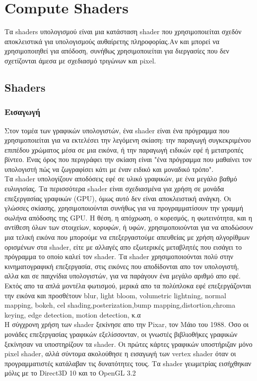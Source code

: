 \section{Compute Shaders}
Τα shaders υπολογισμού είναι μια κατάσταση shader που χρησιμοποιείται σχεδόν αποκλειστικά για υπολογισμούς αυθαίρετης πληροφορίας.Αν και μπορεί να χρησιμοποιηθεί για απόδοση, συνήθως χρησιμοποιείται για διεργασίες που δεν σχετίζονται άμεσα με σχεδιασμό τριγώνων και pixel.\cite{computeshaders-1}
\subsection{Shaders}
\subsubsection{Εισαγωγή}
Στον τομέα των γραφικών υπολογιστών, ένα shader είναι ένα πρόγραμμα που χρησιμοποιείται για να εκτελέσει την λεγόμενη σκίαση: την παραγωγή συγκεκριμένου επιπέδου χρώματος μέσα σε μια εικόνα, ή την παραγωγή ειδικών εφέ ή μετατροπές βίντεο. Ένας όρος που περιγράφει την σκίαση είναι "ένα πρόγραμμα που μαθαίνει τον υπολογιστή πώς να ζωγραφίσει κάτι με έναν ειδικό και μοναδικό τρόπο".\\
Τα shader υπολογίζουν αποδόσεις εφέ σε υλικό γραφικών, με ένα μεγάλο βαθμό ευλυγισίας. Τα περισσότερα shader είναι σχεδιασμένα για χρήση σε μονάδα επεξεργασίας γραφικών (GPU), όμως αυτό δεν είναι αποκλειστική ανάγκη. Οι γλώσσες σκίασης, χρησιμοποιούνται συνήθως για να προγραμματίσουν την γραμμή σωλήνα απόδοσης της GPU. Η θέση, η απόχρωση, ο κορεσμός, η φωτεινότητα, και η αντίθεση όλων των στοιχείων, κορυφών, ή υφών, χρησιμοποιούνται για να αποδώσουν μια τελική εικόνα που μπορούμε να επεξεργαστούμε απευθείας με χρήση αλγορίθμων ορισμένων στα shader, είτε με αλλαγές απο εξωτερικές μεταβλητές που εισάγει το πρόγραμμα το οποίο καλεί τον shader.
Τα shader χρησιμοποιούνται πολύ στην κινηματογραφική επεξεργασία, στις εικόνες που αποδίδονται απο τον υπολογιστή, αλλα και σε παιχνίδια υπολογιστών, για να παράγουν ένα μεγάλο αριθμό απο εφέ. Εκτός απο τα απλά μοντέλα φωτισμού, μερικά απο τα πολύπλοκα εφέ επεξεργάζονται την εικόνα και προσθέτουν blur, light bloom, volumetric lightning, normal mapping, bokeh, cel shading,posterization,bump mapping,distortion,chroma keying, edge detection, motion detection, κ.α\\
Η σύγχρονη χρήση των shader ξεκίνησε απο την Pixar, τον Μάιο του 1988. Όσο οι μονάδες επεξεργασίας γραφικών εξελίσσονταν, οι γνωστές βιβλιοθήκες γραφικών ξεκίνησαν να υποστηρίζουν τα shader. Οι πρώτες κάρτες γραφικών υποστήριζαν μόνο pixel shader, αλλά σύντομα ακολούθησε η εισαγωγή των vertex shader όταν οι προγραμματιστές κατάλαβαν τις δυνατότητες τους. Τα shader γεωμετρίας εισήχθηκαν μόλις με το Direct3D 10 και το OpenGL 3.2
